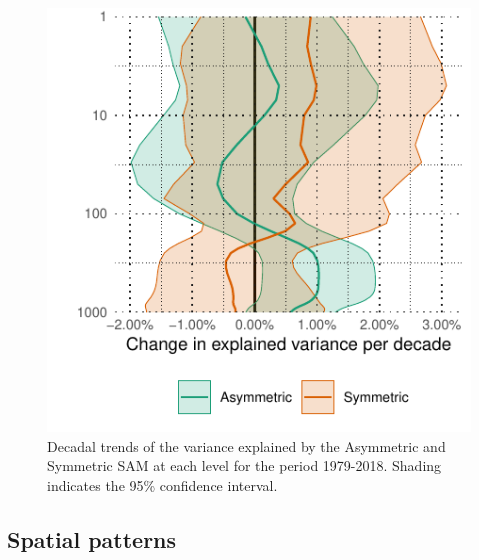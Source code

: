 \documentclass[]{ametsocV5}
\begin{document}
\begin{figure}
\includegraphics{r-squared-trend-1} \caption[Decadal trends of the variance explained by the Asymmetric and Symmetric SAM at each level for the period 1979-2018]{Decadal trends of the variance explained by the Asymmetric and Symmetric SAM at each level for the period 1979-2018. Shading indicates the 95\% confidence interval.}\label{fig:r-squared-trend}
\end{figure}

\subsection{Spatial patterns}

\label{sec:spatial}
\end{document}
